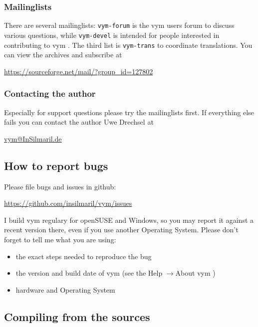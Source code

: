 \documentclass[12pt,a4paper]{article}
\newcommand{\vym}{{\sc vym }}
\newcommand{\ra}{$\longrightarrow$}
\begin{document}
\begin{appendix}
\subsubsection*{Mailinglists}
There are several mailinglists: {\tt vym-forum} is the \vym users forum to
discuss various questions, while {\tt vym-devel} is intended for people
interested in contributing to \vym. The third list is {\tt vym-trans} to
coordinate translations. You can view the archives and subscribe at
\begin{center}
\href{https://sourceforge.net/mail/?group_id=127802}{https://sourceforge.net/mail/?group\_id=127802}
\end{center}

\subsubsection*{Contacting the author}\label{author}
Especially for support questions please try the mailinglists first. If
everything else fails you can contact the author Uwe Drechsel at
\begin{center}
\href{mailto:vym@InSilmaril.de}{vym@InSilmaril.de}
\end{center}



\subsection{How to report bugs}
Please file bugs and issues in github: 
\begin{center}
    \href{ https://github.com/insilmaril/vym/issues}{https://github.com/insilmaril/vym/issues}
\end{center}

I build \vym regulary for openSUSE and Windows, so you may report it against a
recent version there, even if you  use another Operating System.
Please don't forget to tell me what you are using:
\begin{itemize}
    \item the exact steps needed to reproduce the bug
    \item the version and build date of \vym (see the Help \ra About
    \vym)
    \item hardware and Operating System
\end{itemize}

\subsection{Compiling from the sources}

\end{appendix}
\end{document}
